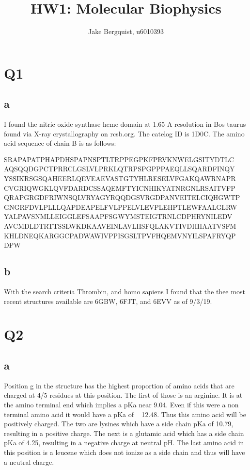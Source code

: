 \documentclass[12pt]{article}
\begin{document}
	
	


\title{HW1: Molecular Biophysics}
\author{Jake Bergquist, u6010393 }
\maketitle

\section{Q1}
\subsection{a}
I found the nitric oxide synthase heme domain at 1.65 A resolution in Bos taurus found via X-ray crystallography on rcsb.org. The catelog ID is 1D0C. The amino acid sequence of chain B is as follows:


  SRAPAPATPHAPDHSPAPNSPTLTRPPEGPKFPRVKNWELGSITYDTLC\\
  AQSQQDGPCTPRRCLGSLVLPRKLQTRPSPGPPPAEQLLSQARDFINQY\\
  YSSIKRSGSQAHEERLQEVEAEVASTGTYHLRESELVFGAKQAWRNAPR\\
  CVGRIQWGKLQVFDARDCSSAQEMFTYICNHIKYATNRGNLRSAITVFP\\
  QRAPGRGDFRIWNSQLVRYAGYRQQDGSVRGDPANVEITELCIQHGWTP\\
  GNGRFDVLPLLLQAPDEAPELFVLPPELVLEVPLEHPTLEWFAALGLRW\\
  YALPAVSNMLLEIGGLEFSAAPFSGWYMSTEIGTRNLCDPHRYNILEDV\\
  AVCMDLDTRTTSSLWKDKAAVEINLAVLHSFQLAKVTIVDHHAATVSFM\\
  KHLDNEQKARGGCPADWAWIVPPISGSLTPVFHQEMVNYILSPAFRYQP\\
  DPW\\

\subsection{b}
With the search criteria Thrombin, and homo sapiens I found that the thee most recent structures available are 6GBW, 6FJT, and 6EVV as of 9/3/19.

\section{Q2}
\subsection{a}
Position g in the structure has the highest proportion of amino acids that are charged at 4/5 residues at this position. The first of those is an arginine. It is at the amino terminal end which implies a pKa near 9.04. Even if this were a non terminal amino acid it would have a pKa of ~ 12.48. Thus this amino acid will be positively charged. The two are lysines which have a side chain pKa of 10.79, resulting in a positive charge. The next is a glutamic acid which has a side chain pKa of 4.25, resulting in a negative charge at neutral pH. The last amino acid in this position is a leucene which does not ionize as a side chain and thus will have a neutral charge.
\end{document}
